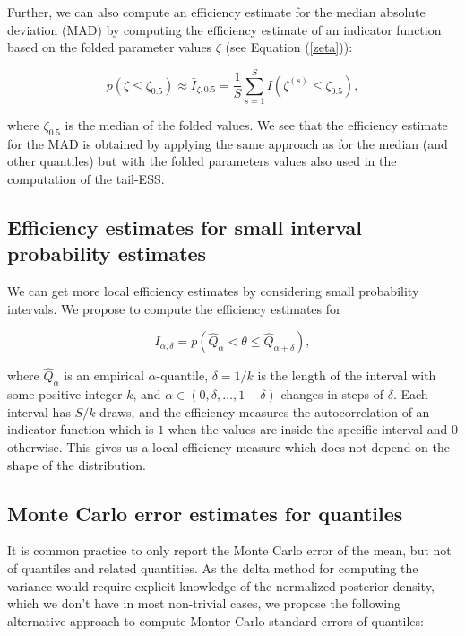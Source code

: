 \documentclass[american,]{article}
\begin{document}
Further, we can also compute an efficiency estimate for the median
absolute deviation (MAD) by computing the efficiency estimate of an
indicator function based on the folded parameter values \(\zeta\) (see
Equation (\ref{zeta})):

\begin{equation}
p(\zeta \leq \zeta_{0.5}) \approx \bar{I}_{\zeta,0.5} = \frac{1}{S}\sum_{s=1}^S
I(\zeta^{(s)} \leq \zeta_{0.5}),
\end{equation}

where \(\zeta_{0.5}\) is the median of the folded values. We see that
the efficiency estimate for the MAD is obtained by applying the same
approach as for the median (and other quantiles) but with the folded
parameters values also used in the computation of the tail-ESS.

\hypertarget{small_interval_S_eff}{%
\subsection{Efficiency estimates for small interval probability
estimates}\label{small_interval_S_eff}}

We can get more local efficiency estimates by considering small
probability intervals. We propose to compute the efficiency estimates
for

\begin{equation}
\bar{I}_{\alpha,\delta} = p(\hat{Q}_\alpha < \theta \leq \hat{Q}_{\alpha+\delta}),
\end{equation}

where \(\hat{Q}_\alpha\) is an empirical \(\alpha\)-quantile,
\(\delta=1/k\) is the length of the interval with some positive integer
\(k\), and \(\alpha \in (0,\delta,\ldots,1-\delta)\) changes in steps of
\(\delta\). Each interval has \(S/k\) draws, and the efficiency measures
the autocorrelation of an indicator function which is \(1\) when the
values are inside the specific interval and \(0\) otherwise. This gives
us a local efficiency measure which does not depend on the shape of the
distribution.

\hypertarget{mcse}{%
\subsection{Monte Carlo error estimates for quantiles}\label{mcse}}

It is common practice to only report the Monte Carlo error of the mean,
but not of quantiles and related quantities. As the delta method for
computing the variance would require explicit knowledge of the
normalized posterior density, which we don't have in most non-trivial
cases, we propose the following alternative approach to compute Montor
Carlo standard errors of quantiles:
\end{document}
